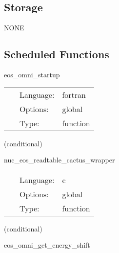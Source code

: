 \subsection*{Storage}NONE
\subsection*{Scheduled Functions}
\vspace{5mm}


\hspace{5mm} eos\_omni\_startup 

\hspace{5mm}{\it set up conversion factors and other fun stuff } 


\hspace{5mm}

 \begin{tabular*}{160mm}{cll} 
~ & Language:  & fortran \\ 
~ & Options:  & global \\ 
~ & Type:  & function \\ 
\end{tabular*} 


\vspace{5mm}

   (conditional) 

\hspace{5mm} nuc\_eos\_readtable\_cactus\_wrapper 

\hspace{5mm}{\it read eos hdf5 table } 


\hspace{5mm}

 \begin{tabular*}{160mm}{cll} 
~ & Language:  & c \\ 
~ & Options:  & global \\ 
~ & Type:  & function \\ 
\end{tabular*} 


\vspace{5mm}

   (conditional) 

\hspace{5mm} eos\_omni\_get\_energy\_shift 

\hspace{5mm}{\it setup energy\_shift in eos\_omni\_module } 



